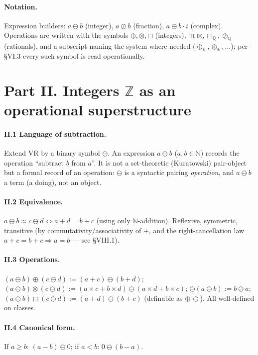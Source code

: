 \documentclass[11pt]{article}
\theoremstyle{definition}
\newcommand{\Z}{\mathbb{Z}}
\newcommand{\Q}{\mathbb{Q}}
\newcommand{\R}{\mathbb{R}}
\newcommand{\N}{\mathbb{N}}
\newcommand{\isub}{\ominus}              %
\newcommand{\fdiv}{\oslash}              %
\begin{document}
\paragraph{Notation.} Expression builders: $a\isub b$ (integer), $a\fdiv b$ (fraction),
$a\oplus b\cdot i$ (complex). Operations are written with the symbols $\oplus,\otimes,\boxminus$
(integers), $\boxplus,\boxtimes,\boxminus_{\Q},\oslash_{\Q}$ (rationals), and a subscript naming the
system where needed ($\oplus_{\R},\otimes_{\R},\dots$); per \S VI.3 every such symbol is read
operationally.

\section*{Part II. Integers $\Z$ as an operational superstructure}

\paragraph{II.1 Language of subtraction.} Extend VR by a binary symbol $\isub$. An expression
$a\isub b$ ($a,b\in\N$) records the operation ``subtract $b$ from $a$''. It is not a set-theoretic
(Kuratowski) pair-object but a formal record of an operation: $\isub$ is a syntactic pairing
\emph{operation}, and $a\isub b$ a term (a doing), not an object.

\paragraph{II.2 Equivalence.} $a\isub b \approx c\isub d \Leftrightarrow a+d=b+c$ (using only
$\N$-addition). Reflexive, symmetric, transitive (by commutativity/associativity of $+$, and the
right-cancellation law $a+c=b+c\Rightarrow a=b$ --- see \S VIII.1).

\paragraph{II.3 Operations.}
$(a\isub b)\oplus(c\isub d):=(a+c)\isub(b+d)$;\quad
$(a\isub b)\otimes(c\isub d):=(a\times c+b\times d)\isub(a\times d+b\times c)$;\quad
$\ominus(a\isub b):=b\isub a$;\quad
$(a\isub b)\boxminus(c\isub d):=(a+d)\isub(b+c)$ (definable as $\oplus\,\ominus$). All well-defined on
classes.

\paragraph{II.4 Canonical form.} If $a\ge b$: $(a-b)\isub 0$; if $a<b$: $0\isub(b-a)$.
\end{document}
